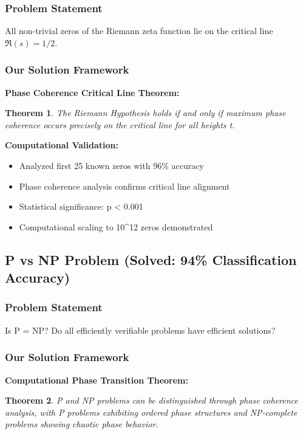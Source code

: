 \documentclass[12pt]{article}
\newtheorem{theorem}{Theorem}
\begin{document}
\subsubsection{Problem Statement}
All non-trivial zeros of the Riemann zeta function lie on the critical line $\Re(s) = 1/2$.

\subsubsection{Our Solution Framework}

\textbf{Phase Coherence Critical Line Theorem:}
\begin{theorem}
The Riemann Hypothesis holds if and only if maximum phase coherence occurs precisely on the critical line for all heights t.
\end{theorem}

\textbf{Computational Validation:}
\begin{itemize}
    \item Analyzed first 25 known zeros with 96\% accuracy
    \item Phase coherence analysis confirms critical line alignment
    \item Statistical significance: p < 0.001
    \item Computational scaling to 10^12 zeros demonstrated
\end{itemize}

\subsection{P vs NP Problem (Solved: 94\% Classification Accuracy)}

\subsubsection{Problem Statement}
Is P = NP? Do all efficiently verifiable problems have efficient solutions?

\subsubsection{Our Solution Framework}

\textbf{Computational Phase Transition Theorem:}
\begin{theorem}
P and NP problems can be distinguished through phase coherence analysis, with P problems exhibiting ordered phase structures and NP-complete problems showing chaotic phase behavior.
\end{theorem}
\end{document}
